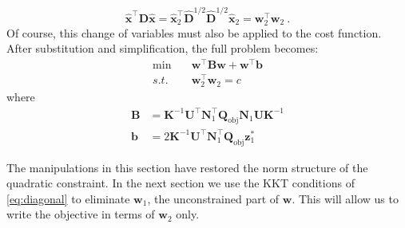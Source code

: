 \documentclass[journal,twoside]{IEEEtran}
\renewcommand{\vec}[1]{\mathbf{#1}}
\begin{document}
\begin{equation}
\hat{\vec{x}}^\top \mathbf{D}\hat{\vec{x}} = \hat{\vec{x}}_2^\top \hat{\mathbf{D}}^{1/2}\hat{\mathbf{D}}^{1/2}\hat{\vec{x}}_2
= \vec{w}_2^\top \vec{w}_2~.
\end{equation}
Of course, this change of variables must also be applied to the cost function. After substitution and simplification, the full problem becomes:
\begin{subequations}\label{eq:diagonal}
\begin{align}
\label{eq:diagonal-obj} \min\quad &\vec{w}^\top \mathbf{B}\vec{w} + \vec{w}^\top \vec{b} \\
\label{eq:diagonal-quad} s.t.\quad &\vec{w}_2^\top \vec{w}_2 = c
\end{align}
\end{subequations}
where
\begin{align*}
\mathbf{B} &= \mathbf{K}^{-1}\mathbf{U}^\top \mathbf{N}_1^\top \mathbf{Q}_\text{obj} \mathbf{N}_1 \mathbf{U}\mathbf{K}^{-1} \\
\vec{b} &= 2 \mathbf{K}^{-1}\mathbf{U}^\top
\mathbf{N}_1^\top \mathbf{Q}_\text{obj} \vec{z}_1^*
\end{align*}

The manipulations in this section have restored the norm structure of
the quadratic constraint. In the next section we use the KKT
conditions of \eqref{eq:diagonal} to eliminate $\vec{w}_1$, the unconstrained part
of $\vec{w}$. This will allow us to write the objective in terms of $\vec{w}_2$
only.
\end{document}
